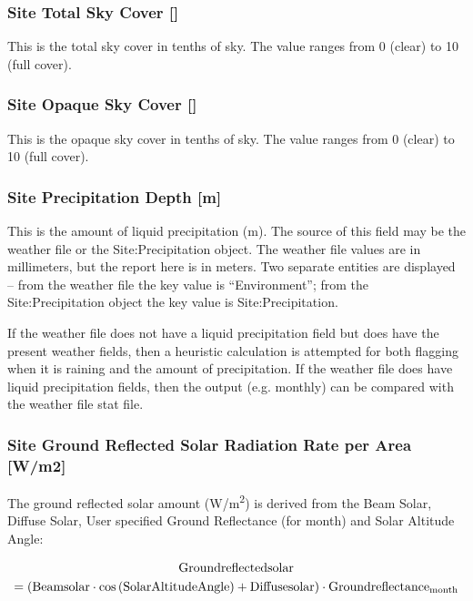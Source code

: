 \subsubsection{Site Total Sky Cover {[]}}\label{site-total-sky-cover}

This is the total sky cover in tenths of sky. The value ranges from 0 (clear) to 10 (full cover). 

\subsubsection{Site Opaque Sky Cover {[]}}\label{site-opaque-sky-cover}

This is the opaque sky cover in tenths of sky. The value ranges from 0 (clear) to 10 (full cover). 

\subsubsection{Site Precipitation Depth {[}m{]}}\label{site-precipitation-depth-m}

This is the amount of liquid precipitation (m). The source of this field may be the weather file or the Site:Precipitation object. The weather file values are in millimeters, but the report here is in meters. Two separate entities are displayed -- from the weather file the key value is ``Environment''; from the Site:Precipitation object the key value is Site:Precipitation.

If the weather file does not have a liquid precipitation field but does have the present weather fields, then a heuristic calculation is attempted for both flagging when it is raining and the amount of precipitation. If the weather file does have liquid precipitation fields, then the output (e.g. monthly) can be compared with the weather file stat file.

\subsubsection{Site Ground Reflected Solar Radiation Rate per Area {[}W/m2{]}}\label{site-ground-reflected-solar-radiation-rate-per-area-wm2}

The ground reflected solar amount (\si{W/m^2}) is derived from the Beam Solar, Diffuse Solar, User specified Ground Reflectance (for month) and Solar Altitude Angle:

\begin{multline}
  \rm{Groundreflectedsolar}
  \\
  = \left( \rm{Beamsolar} \cdot cos \left( \rm{SolarAltitudeAngle} \right) + \rm{Diffusesolar} \right) \cdot \rm{Groundreflectance}_{\rm{month}}
\end{multline}

